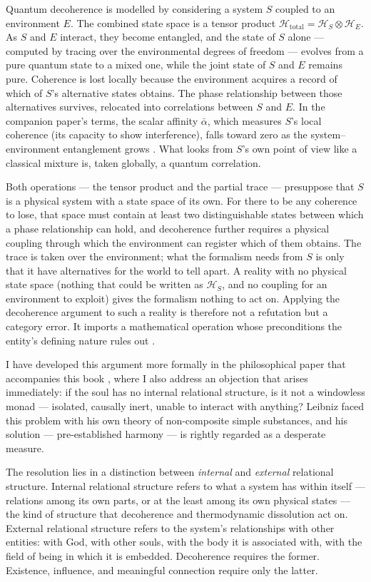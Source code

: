 Quantum decoherence is modelled by considering a system $S$ coupled to an
environment $E$. The combined state space is a tensor product
$\mathcal{H}_\mathrm{total} = \mathcal{H}_S \otimes \mathcal{H}_E$. As $S$
and $E$ interact, they become entangled, and the state of $S$ alone --- computed
by tracing over the environmental degrees of freedom --- evolves from a pure
quantum state to a mixed one, while the joint state of $S$ and $E$ remains
pure. Coherence is lost locally because the environment acquires a record of
which of $S$'s alternative states obtains. The phase relationship between those
alternatives survives, relocated into correlations between $S$ and $E$. In the
companion paper's terms, the scalar affinity $\bar{\alpha}$, which measures
$S$'s local coherence (its capacity to show interference), falls toward zero as
the system--environment entanglement grows \citep{AdamsRCT}. What looks from
$S$'s own point of view like a classical mixture is, taken globally, a quantum
correlation.

Both operations --- the tensor product and the partial trace --- presuppose that
$S$ is a physical system with a state space of its own. For there to be any
coherence to lose, that space must contain at least two distinguishable states
between which a phase relationship can hold, and decoherence further requires a
physical coupling through which the environment can register which of them
obtains. The trace is taken over the environment; what the formalism needs from
$S$ is only that it have alternatives for the world to tell apart. A reality
with no physical state space (nothing that could be written as $\mathcal{H}_S$,
and no coupling for an environment to exploit) gives the formalism nothing to
act on. Applying the decoherence argument to such a reality is therefore not a
refutation but a category error. It imports a
mathematical operation whose preconditions the entity's defining nature rules
out \citep{AdamsThreePaths}.

I have developed this argument more formally in the philosophical paper that
accompanies this book \citep{AdamsThreePaths}, where I also address an
objection that arises immediately: if the soul has no internal relational
structure, is it not a windowless monad --- isolated, causally inert, unable to
interact with anything? Leibniz faced this problem with his own theory of
non-composite simple substances, and his solution --- pre-established harmony ---
is rightly regarded as a desperate measure.

The resolution lies in a distinction between \emph{internal} and
\emph{external} relational structure. Internal relational structure refers to
what a system has within itself --- relations among its own parts, or at the
least among its own physical states --- the kind of structure that decoherence
and thermodynamic dissolution act on. External relational
structure refers to the system's relationships with other entities: with God,
with other souls, with the body it is associated with, with the field of
being in which it is embedded. Decoherence requires the former. Existence,
influence, and meaningful connection require only the latter.

